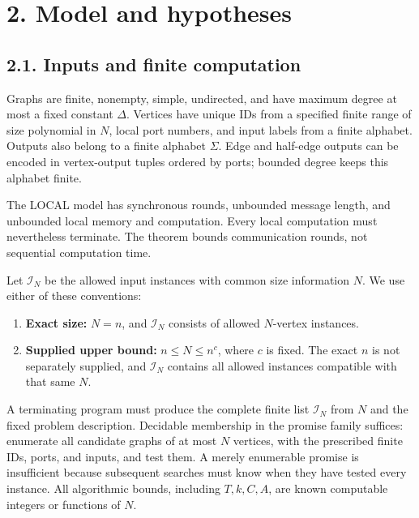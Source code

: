 \documentclass[11pt,a4paper]{article}
\providecommand{\tightlist}{\setlength{\itemsep}{0pt}\setlength{\parskip}{0pt}}
\begin{document}
\section{2. Model and hypotheses}\label{model-and-hypotheses}

\subsection{2.1. Inputs and finite computation}\label{inputs-and-finite-computation}

Graphs are finite, nonempty, simple, undirected, and have maximum degree at most a fixed constant \(\Delta\).
Vertices have unique IDs from a specified finite range of size polynomial in \(N\), local port numbers, and input labels from a finite alphabet.
Outputs also belong to a finite alphabet \(\Sigma\).
Edge and half-edge outputs can be encoded in vertex-output tuples ordered by ports; bounded degree keeps this alphabet finite.

The LOCAL model has synchronous rounds, unbounded message length, and unbounded local memory and computation.
Every local computation must nevertheless terminate.
The theorem bounds communication rounds, not sequential computation time.

Let \(\mathcal I_N\) be the allowed input instances with common size information \(N\).
We use either of these conventions:

\begin{enumerate}
\def\labelenumi{\arabic{enumi}.}
\tightlist
\item \textbf{Exact size:} \(N=n\), and \(\mathcal I_N\) consists of allowed \(N\)-vertex instances.
\item \textbf{Supplied upper bound:} \(n\le N\le n^c\), where \(c\) is fixed.
The exact \(n\) is not separately supplied, and \(\mathcal I_N\) contains all allowed instances compatible with that same \(N\).
\end{enumerate}

A terminating program must produce the complete finite list \(\mathcal I_N\) from \(N\) and the fixed problem description.
Decidable membership in the promise family suffices: enumerate all candidate graphs of at most \(N\) vertices, with the prescribed finite IDs, ports, and inputs, and test them.
A merely enumerable promise is insufficient because subsequent searches must know when they have tested every instance.
All algorithmic bounds, including \(T,k,C,A\), are known computable integers or functions of \(N\).
\end{document}

